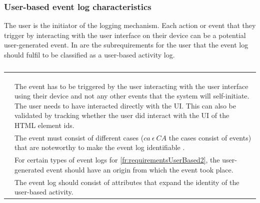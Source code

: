 \subsubsection{User-based event log characteristics}\label{sec:ch2_requirementsOfUAT}
The user is the initiator of the logging mechanism. Each action or event that they trigger by interacting with the user interface on their device can be a potential user-generated event. In  are the subrequirements for the user that the event log should fulfil to be classified as a user-based activity log.

\setcounter{phase}{1}
\setcounter{subphase}{1}
\begin{xltabular}{\textwidth}{lX}
	\caption[Requirements for an event to be a user-based activity]{\textit{Requirements for an event to be a user-based activity}}\label{tbl:ch2_requirementsForUserActivtyEvent} \\
	\toprule
	 & \\
	\midrule
	\endfirsthead

	\caption[]{\continueCaption} \\
	\toprule
	 & \\
	\midrule
	\endhead

	\midrule
	 \\ 
	\endfoot
	\endlastfoot

	 & The event has to be triggered by the user interacting with the user interface using their device and not any other events that the system will self-initiate. The user needs to have interacted directly with the UI. This can also be validated by tracking whether the user did interact with the UI of the HTML element ids. \\

	 & The event must consist of different cases ($ca~\epsilon~CA$ the cases consist of events) that are noteworthy to make the event log identifiable \cite{Slaninova2014}. \\

	 & For certain types of event logs for \ref{fr:requirementsUserBased2}, the user-generated event should have an origin from which the event took place. \\

	 & The event log should consist of attributes that expand the identity of the user-based activity. \\


\end{xltabular}
